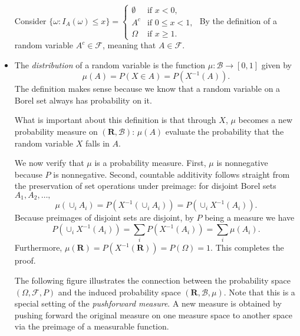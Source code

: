 \documentclass[11pt]{article}
\newcommand{\df}[1]{\textit{\textsf{#1}}} %
\newcommand{\R}{\mathbf{R}}
\newcommand{\B}{\mathcal{B}} %
\newcommand{\F}{\mathcal{F}} %
\begin{document}
\begin{itemize}
    Consider $\{\omega : I_A(\omega) \leq x\} = 
    \begin{cases}
        \emptyset & \text{if } x < 0, \\
        A^c & \text{if } 0 \leq x < 1, \\
        \Omega & \text{if } x \geq 1.
    \end{cases}$ By the definition of a random variable $A^c \in \F$, meaning that $A \in \F$.
    \item The \df{distribution} of a random variable is the function $\mu: \B \to [0,1]$ given by \[\mu(A) = P(X \in A) = P(X^{-1}(A)).\]
    The definition makes sense because we know that a random variable on a Borel set always has probability on it.

    What is important about this definition is that through $X$, $\mu$ becomes a new probability measure on $(\R, \B)$: $\mu(A)$ evaluate the probability that the random variable $X$ falls in $A$.

    We now verify that $\mu$ is a probability measure. First, $\mu$ is nonnegative because $P$ is nonnegative. Second, countable additivity follows straight from the preservation of set operations under preimage: for disjoint Borel sets $A_1,A_2,\dots,$ \[\mu(\cup_i A_i) = P(X^{-1}(\cup_i A_i)) = P(\cup_i X^{-1}(A_i)).\] Because preimages of disjoint sets are disjoint, by $P$ being a measure we have \[\textstyle P(\cup_i X^{-1}(A_i)) = \sum_i P(X^{-1}(A_i)) = \sum_i \mu(A_i).\] Furthermore, $\mu(\R) = P(X^{-1}(\R)) = P(\Omega) = 1$. This completes the proof.
    
    The following figure illustrates the connection between the probability space $(\Omega,\F,P)$ and the induced probability space $(\R,\B,\mu)$.
    Note that this is a special setting of the \df{pushforward measure}. A new measure is obtained by pushing forward the original measure on one measure space to another space via the preimage of a measurable function.
\end{itemize}
\end{document}
